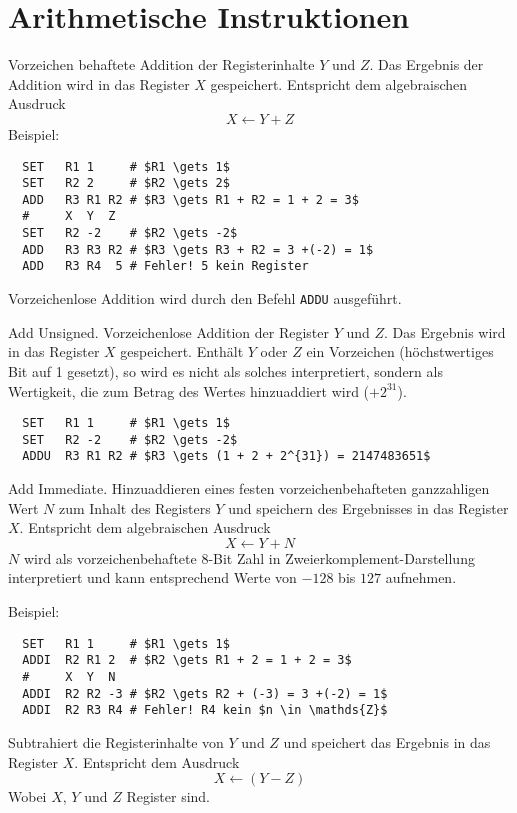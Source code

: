 \section{Arithmetische Instruktionen} 

Vorzeichen behaftete Addition der Registerinhalte $Y$ und $Z$.
Das Ergebnis der Addition wird in das Register $X$ gespeichert.
Entspricht dem algebraischen Ausdruck
\[
    X \gets Y + Z
\]
Beispiel:
\begin{lstlisting}
  SET   R1 1     # $R1 \gets 1$
  SET   R2 2     # $R2 \gets 2$
  ADD   R3 R1 R2 # $R3 \gets R1 + R2 = 1 + 2 = 3$
  #     X  Y  Z
  SET   R2 -2    # $R2 \gets -2$
  ADD   R3 R3 R2 # $R3 \gets R3 + R2 = 3 +(-2) = 1$
  ADD   R3 R4  5 # Fehler! 5 kein Register
\end{lstlisting}
Vorzeichenlose Addition wird durch den Befehl \texttt{ADDU} ausgeführt.


\glqq Add Unsigned\grqq.
Vorzeichenlose Addition der Register $Y$ und $Z$. Das Ergebnis wird in das
Register $X$ gespeichert. Enthält $Y$ oder $Z$ ein Vorzeichen (höchstwertiges
Bit auf 1 gesetzt), so wird es nicht als solches interpretiert, sondern als
Wertigkeit, die zum Betrag des Wertes hinzuaddiert wird ($+2^{31}$).

\begin{lstlisting}
  SET   R1 1     # $R1 \gets 1$
  SET   R2 -2    # $R2 \gets -2$
  ADDU  R3 R1 R2 # $R3 \gets (1 + 2 + 2^{31}) = 2147483651$
\end{lstlisting}



\glqq Add Immediate\grqq.
Hinzuaddieren eines festen vorzeichenbehafteten ganzzahligen Wert $N$ zum Inhalt
des Registers $Y$ und speichern des Ergebnisses in das Register $X$.
Entspricht dem algebraischen Ausdruck
\[
  X \gets Y + N
\]
$N$ wird als vorzeichenbehaftete 8-Bit Zahl in Zweierkomplement-Darstellung
interpretiert und kann entsprechend Werte von $-128$ bis $127$ aufnehmen.

Beispiel:
\begin{lstlisting}
  SET   R1 1     # $R1 \gets 1$
  ADDI  R2 R1 2  # $R2 \gets R1 + 2 = 1 + 2 = 3$
  #     X  Y  N
  ADDI  R2 R2 -3 # $R2 \gets R2 + (-3) = 3 +(-2) = 1$
  ADDI  R2 R3 R4 # Fehler! R4 kein $n \in \mathds{Z}$
\end{lstlisting}



Subtrahiert die Registerinhalte von $Y$ und $Z$ und speichert das Ergebnis in
das Register $X$. Entspricht dem Ausdruck
\[
    X \gets (Y - Z)
\]
Wobei $X$, $Y$ und $Z$ Register sind.



